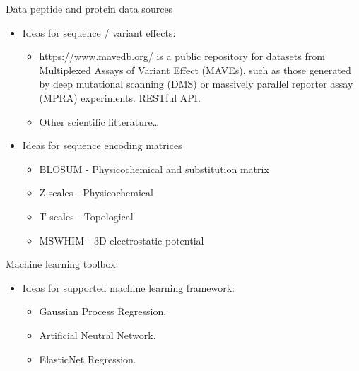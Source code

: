 \documentclass[ignorenonframetext,]{beamer}
\providecommand{\tightlist}{%
  \setlength{\itemsep}{0pt}\setlength{\parskip}{0pt}}
\begin{document}
\begin{frame}{Data peptide and protein data sources}
\protect\hypertarget{data-peptide-and-protein-data-sources}{}

\begin{itemize}
\tightlist
\item
  Ideas for sequence / variant effects:

  \begin{itemize}
  \tightlist
  \item
    \url{https://www.mavedb.org/} is a public repository for datasets
    from Multiplexed Assays of Variant Effect (MAVEs), such as those
    generated by deep mutational scanning (DMS) or massively parallel
    reporter assay (MPRA) experiments. RESTful API.
  \item
    Other scientific litterature\ldots{}
  \end{itemize}
\item
  Ideas for sequence encoding matrices

  \begin{itemize}
  \tightlist
  \item
    BLOSUM - Physicochemical and substitution matrix
  \item
    Z-scales - Physicochemical
  \item
    T-scales - Topological
  \item
    MSWHIM - 3D electrostatic potential
  \end{itemize}
\end{itemize}

\end{frame}

\begin{frame}{Machine learning toolbox}
\protect\hypertarget{machine-learning-toolbox}{}

\begin{itemize}
\item
  Ideas for supported machine learning framework:

  \begin{itemize}
  \tightlist
  \item
    Gaussian Process Regression.
  \item
    Artificial Neutral Network.
  \item
    ElasticNet Regression.
  \end{itemize}
\end{itemize}

\end{frame}
\end{document}
